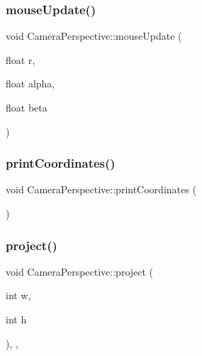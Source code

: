 \subsubsection{\texorpdfstring{mouse\+Update()}{mouseUpdate()}}
{\footnotesize\ttfamily void Camera\+Perspective\+::mouse\+Update (\begin{DoxyParamCaption}\item[{float}]{r,  }\item[{float}]{alpha,  }\item[{float}]{beta }\end{DoxyParamCaption})\hspace{0.3cm}{\ttfamily [inline]}}

\mbox{\label{class_camera_perspective_a3e3875dbaf831674e33e5aee8d179224}} 
\subsubsection{\texorpdfstring{print\+Coordinates()}{printCoordinates()}}
{\footnotesize\ttfamily void Camera\+Perspective\+::print\+Coordinates (\begin{DoxyParamCaption}{ }\end{DoxyParamCaption})\hspace{0.3cm}{\ttfamily [inline]}}

\mbox{\label{class_camera_perspective_a841f648f4131897ec632cfcb55facf97}} 
\subsubsection{\texorpdfstring{project()}{project()}}
{\footnotesize\ttfamily void Camera\+Perspective\+::project (\begin{DoxyParamCaption}\item[{int}]{w,  }\item[{int}]{h }\end{DoxyParamCaption})\hspace{0.3cm}{\ttfamily [inline]}, {\ttfamily [override]}, {\ttfamily [virtual]}}




